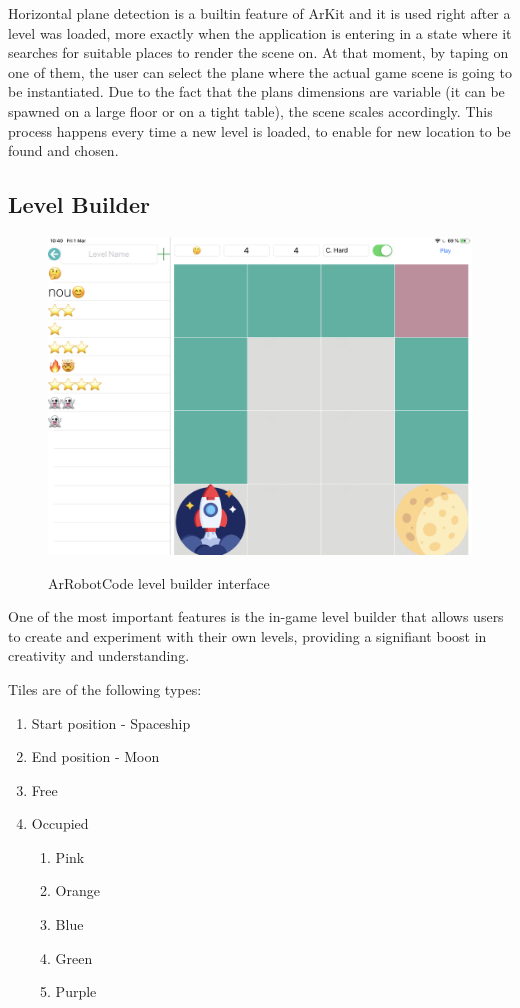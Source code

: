 \documentclass[12 pct]{report}
\begin{document}
Horizontal plane detection is a builtin feature of ArKit and it is used right after a level was loaded, more exactly when the application is entering in a state where it searches for suitable places to render the scene on. At that moment, by taping on one of them, the user can select the plane where the actual game scene is going to be instantiated. Due to the fact that the plans dimensions are variable (it can be spawned on a large floor or on a tight table), the scene scales accordingly. This process happens every time a new level is loaded, to enable for new location to be found and chosen.
\subsection*{Level Builder}
\begin{figure}[H]
\includegraphics[width=1.0\textwidth]{ArRobotCode3}
\centering
\label{fig:levelBuilder}
\caption{ArRobotCode level builder interface}
\end{figure}

One of the most important features is the in-game level builder that allows users to create and experiment with their own levels, providing a signifiant boost in creativity and understanding. 

Tiles are of the following types:
\begin{enumerate}
\item Start position - Spaceship
\item End position - Moon
\item Free
\item Occupied
\begin{enumerate}
\item Pink
\item Orange
\item Blue
\item Green
\item Purple
\end{enumerate}
\end{enumerate}
\end{document}
